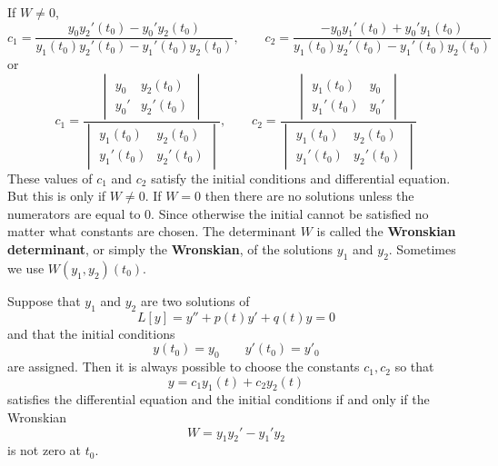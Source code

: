     If $W \neq 0$,
    \begin{equation*}
        c_1 = \frac{y_0y_2'(t_0) - y_0'y_2(t_0)}{y_1(t_0)y_2'(t_0) - y_1'(t_0)y_2(t_0)}, \qquad c_2 = \frac{-y_0y_1'(t_0) + y_0'y_1(t_0)}{y_1(t_0)y_2'(t_0) - y_1'(t_0)y_2(t_0)}
    \end{equation*}
    or 
    \begin{equation*}
        c_1 = \frac{
            \begin{vmatrix}
                y_0 & y_2(t_0) \\
                y_0' & y_2'(t_0)
            \end{vmatrix}
        }{
            \begin{vmatrix}
                y_1(t_0) & y_2(t_0) \\
                y_1'(t_0) & y_2'(t_0)
            \end{vmatrix}
        }, \qquad 
        c_2 = \frac{
            \begin{vmatrix}
                y_1(t_0) & y_0 \\
                y_1'(t_0) & y_0'
            \end{vmatrix}
        }{
            \begin{vmatrix}
                y_1(t_0) & y_2(t_0) \\
                y_1'(t_0) & y_2'(t_0)
            \end{vmatrix}
        }
    \end{equation*}
    These values of $c_1$ and $c_2$ satisfy the initial conditions and differential equation. But this is only if $W \neq 0$. If $W = 0$ then there are no solutions unless the numerators are equal to 0. Since otherwise the initial cannot be satisfied no matter what constants are chosen.
    \newline \indent
    The determinant $W$ is called the \textbf{Wronskian determinant}, or simply the \textbf{Wronskian}, of the solutions $y_1$ and $y_2$. Sometimes we use $W(y_1, y_2)(t_0)$.
    \begin{theorem}
        Suppose that $y_1$ and $y_2$ are two solutions of
        \begin{equation*}
            L[y] = y'' + p(t)y' + q(t)y = 0
        \end{equation*}
        and that the initial conditions
        \begin{equation*}
            y(t_0) = y_0 \qquad y'(t_0) = y'_0
        \end{equation*}
        are assigned. Then it is always possible to choose the constants $c_1, c_2$ so that 
        \begin{equation*}
            y = c_1y_1(t) + c_2y_2(t)
        \end{equation*}
        satisfies the differential equation and the initial conditions if and only if the Wronskian
        \begin{equation*}
            W = y_1y_2' - y_1'y_2
        \end{equation*}
        is not zero at $t_0$.
    \end{theorem}
